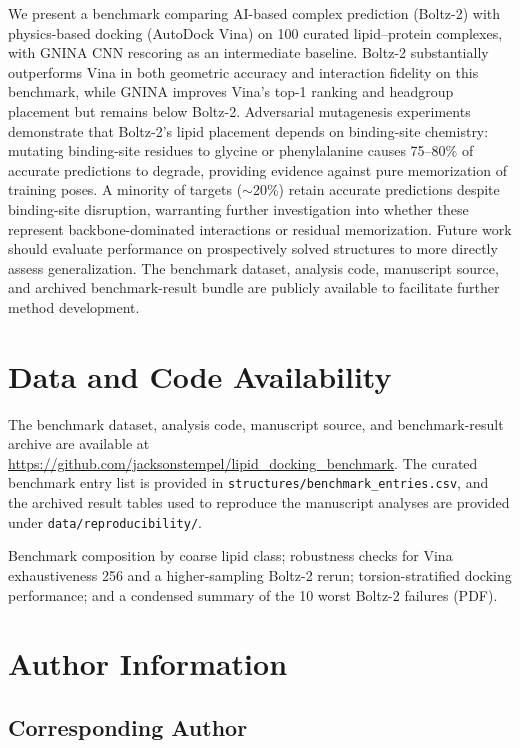 \documentclass[journal=jcisd8,manuscript=article]{achemso}
\begin{document}
We present a benchmark comparing AI-based complex prediction (Boltz-2) with physics-based docking (AutoDock Vina) on 100 curated lipid--protein complexes, with GNINA CNN rescoring as an intermediate baseline.
Boltz-2 substantially outperforms Vina in both geometric accuracy and interaction fidelity on this benchmark, while GNINA improves Vina's top-1 ranking and headgroup placement but remains below Boltz-2.
Adversarial mutagenesis experiments demonstrate that Boltz-2's lipid placement depends on binding-site chemistry: mutating binding-site residues to glycine or phenylalanine causes 75--80\% of accurate predictions to degrade, providing evidence against pure memorization of training poses.
A minority of targets ($\sim$20\%) retain accurate predictions despite binding-site disruption, warranting further investigation into whether these represent backbone-dominated interactions or residual memorization.
Future work should evaluate performance on prospectively solved structures to more directly assess generalization.
The benchmark dataset, analysis code, manuscript source, and archived benchmark-result bundle are publicly available to facilitate further method development.

	\section*{Data and Code Availability}
	
	The benchmark dataset, analysis code, manuscript source, and benchmark-result archive are available at \url{https://github.com/jacksonstempel/lipid_docking_benchmark}.
	The curated benchmark entry list is provided in \texttt{structures/benchmark\_entries.csv}, and the archived result tables used to reproduce the manuscript analyses are provided under \texttt{data/reproducibility/}.

\begin{suppinfo}
Benchmark composition by coarse lipid class; robustness checks for Vina exhaustiveness 256 and a higher-sampling Boltz-2 rerun; torsion-stratified docking performance; and a condensed summary of the 10 worst Boltz-2 failures (PDF).
\end{suppinfo}

\section*{Author Information}

\subsection*{Corresponding Author}
\end{document}
